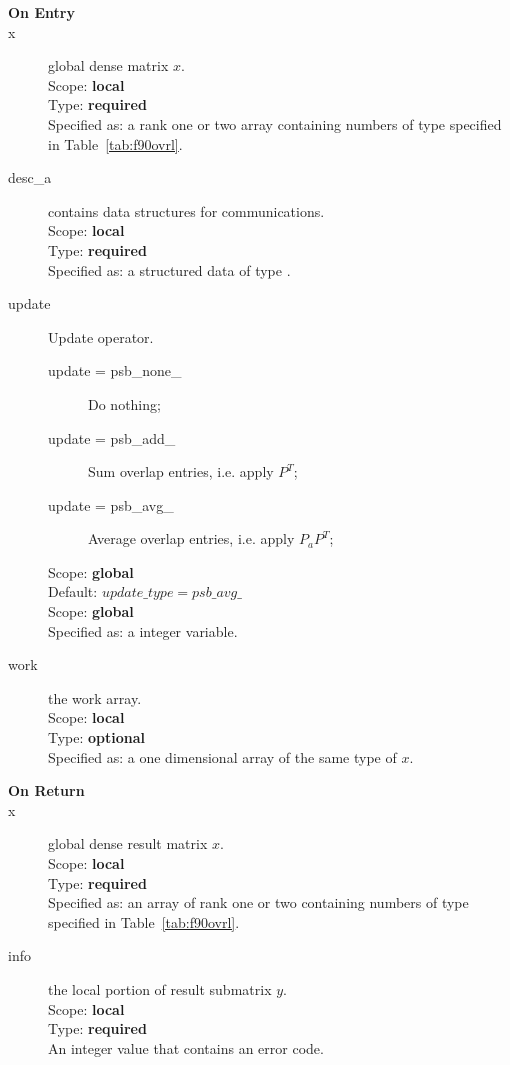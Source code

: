 \begin{description}
\item[\bf On Entry]
\item[x] global dense matrix $x$.\\
Scope: {\bf local} \\
Type: {\bf required} \\
Specified as:  a rank one or two array 
containing numbers of type specified in
Table~\ref{tab:f90ovrl}.
\item[desc\_a] contains data structures for communications.\\
Scope: {\bf local} \\
Type: {\bf required}\\
Specified as: a structured data of type \descdata.
\item[update] Update operator. \\
\begin{description}
\item[update = psb\_none\_] Do nothing;
\item[update = psb\_add\_] Sum overlap entries, i.e. apply $P^T$;
\item[update = psb\_avg\_] Average overlap entries, i.e. apply $P_aP^T$;
\end{description}
Scope: {\bf global} \\
Default: $update\_type = psb\_avg\_ $\\	
Scope: {\bf global} \\
Specified as: a integer variable.
\item[work] the work array. \\
Scope: {\bf local} \\
Type: {\bf optional}\\
Specified as: a one dimensional array of the same type of $x$.

\item[\bf On Return] 
\item[x] global dense result matrix $x$.\\
Scope: {\bf local} \\
Type: {\bf required} \\
Specified as: an  array of rank one or two
containing numbers of type specified in
Table~\ref{tab:f90ovrl}.
\item[info] the local portion of result submatrix $y$.\\
Scope: {\bf local} \\
Type: {\bf required} \\
An integer value that contains an error code. 
\end{description}


